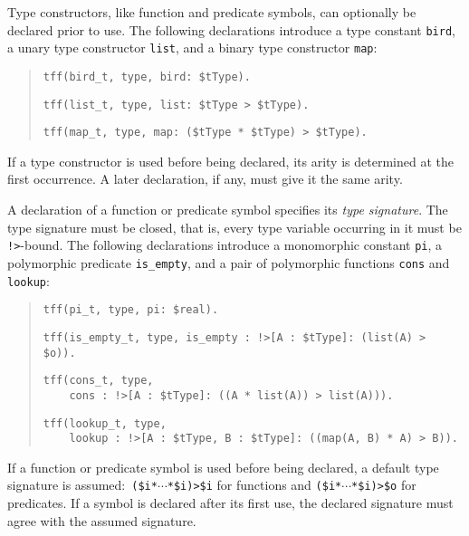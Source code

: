 
 Type constructors,
like function and predicate symbols,
can optionally be declared prior to use.
The following declarations introduce a type
constant {\tt bird}, a unary type constructor {\tt list},
and a binary type constructor {\tt map}:
\begin{quote}
\verb+tff(bird_t, type, bird: $tType).+
\par\smallskip
\verb+tff(list_t, type, list: $tType > $tType).+
\par\smallskip
\verb+tff(map_t, type, map: ($tType * $tType) > $tType).+
\end{quote}
If a type constructor is used before being declared, its arity is
determined at the first occurrence. A later declaration, if any,
must give it the same arity.

A declaration of a function or predicate symbol specifies its
{\em type signature}.
The type signature must be closed, that is, every type variable
occurring in it must be {\tt !>}-bound.
The following declarations introduce a monomorphic
constant {\tt pi}, a polymorphic predicate
{\tt is\_empty}, and a pair of polymorphic functions {\tt cons} and {\tt lookup}:
\begin{quote}
\verb+tff(pi_t, type, pi: $real).+
\par\smallskip
\verb+tff(is_empty_t, type, is_empty : !>[A : $tType]: (list(A) > $o)).+\kern-10mm
\par\smallskip
\verb+tff(cons_t, type,+\\
\verb+    cons : !>[A : $tType]: ((A * list(A)) > list(A))).+
\par\smallskip
\verb+tff(lookup_t, type,+\\
\verb+    lookup : !>[A : $tType, B : $tType]: ((map(A, B) * A) > B)).+\kern-10mm
\end{quote}
If a function or predicate symbol is used before being declared, a
default type signature is assumed:\ {\tt (\$i\;*\;${\cdots}$\;*\;\$i)\;>\;\$i}
for functions and {\tt (\$i\;*\;${\cdots}$\;*\;\$i)\;>\;\$o} for predicates.
If a symbol is declared after its first use, the declared signature
must agree with the assumed signature.

